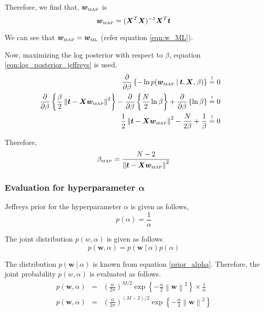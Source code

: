\documentclass[11pt]{article}
\newcommand{\mle}[1]{{#1}_{\text{\tiny ML}}}
\newcommand{\map}[1]{{#1}_{\text{\tiny MAP}}}
\newcommand\given[1][]{\:#1\vert\:}
\newcommand{\norm}[1]{\left\lVert#1\right\rVert}
\begin{document}
Therefore, we find that, $\map{\bm{w}}$ is
\begin{equation}
    \map{\bm{w}} = (\bm{X}^T \bm{X})^{-1} \bm{X}^T \bm{t}
\end{equation}

We can see that $\map{\bm{w}} = \mle{\bm w}$ (refer equation \ref{eqn:w_ML}). 

Now, maximizing the log posterior with respect to $\beta$, equation \ref{eqn:log_posterior_jeffreys} is used.
\begin{eqnarray}
    \frac{\partial }{\partial  \beta} \left\{ -\ln{p(\map{\bm{w}} \given \bm{t}, \bm{X}, \beta)} \right\} 
    &\overset{!}{=} 0& \\
    \frac{\partial }{\partial \beta} \left\{\frac{\beta}{2} \norm{\bm{t} - \bm{X}\map{\bm{w}}}^2 \right\}
    - \frac{\partial }{\partial \beta} \left\{\frac{N}{2}\ln{\beta} \right\} + \frac{\partial }{\partial \beta} \left\{ \ln{\beta} \right\}
    &\overset{!}{=} 0& \\
    \frac{1}{2} \norm{\bm{t} - \bm{X}\map{\bm{w}}}^2 - \frac{N}{2\beta} + \frac{1}{\beta}
    &\overset{!}{=} 0&
\end{eqnarray}

Therefore, 
\begin{equation} \label{beta_map}
    \map{\beta} = \frac{N-2}{\norm{\bm{t} - \bm{X}\map{\bm{w}}}^2}
\end{equation}

\subsubsection{Evaluation for hyperparameter $\bm{\alpha}$}

Jeffreys prior for the hyperparameter $\alpha$ is given as follows,
\begin{equation} \label{eqn:alpha_jeffreys}
    p(\alpha) = \frac{1}{\alpha}
\end{equation}

The joint distribution $p(w,\alpha)$ is given as follows
\begin{equation} \label{eqn:joint_alpha}
    p(\bm{w}, \alpha) = p(\bm{w} \given \alpha)p(\alpha)
\end{equation}

The distribution $p(\bm{w} \given \alpha)$ is known from equation \ref{prior_alpha}. Therefore, the joint probability $p(w, \alpha)$ is evaluated as follows.
\begin{eqnarray}
    p(\bm{w}, \alpha) 
    &=&
    \left( \frac{\alpha}{2\pi}\right)^{M/2} \exp{\left\{ -\frac{\alpha}{2}\norm{\bm{w}}^2\right\}} \times \frac{1}{\alpha} \\
    p(\bm{w}, \alpha) 
    &=& 
    \left( \frac{\alpha}{2\pi}\right)^{\left( M-2\right)/2} \exp{\left\{ -\frac{\alpha}{2}\norm{\bm{w}}^2\right\}}
\end{eqnarray}
\end{document}
